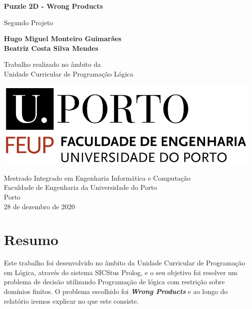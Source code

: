 \documentclass[11pt]{article}
\begin{document}
\begin{titlepage}
	\begin{center}
		\vspace*{1cm}
		
		\Large
		\textbf{Puzzle 2D - Wrong Products}
		
		\vspace{0.5cm}
		\large
		Segundo Projeto
		
		\vspace{1.5cm}
		
		\textbf{Hugo Miguel Monteiro Guimarães}\\
		\textbf{Beatriz Costa Silva Mendes}
		
		\vspace{5cm}
		
		Trabalho realizado no âmbito da\\
		Unidade Curricular de Programação Lógica
		
		\vspace{0.8cm}
	
		\includegraphics[width=0.4 \textwidth]{feup_logo.png}
		
		\vspace{1.5cm}		
		
		\large
		Mestrado Integrado em Engenharia Informática e Computação\\
		Faculdade de Engenharia da Universidade do Porto\\
		Porto\\
		28	 de dezembro de 2020
	
	\end{center}
\end{titlepage}


\pagebreak
\tableofcontents

\pagebreak


\section{Resumo} 
Este trabalho foi desenvolvido no âmbito da Unidade Curricular de Programação em Lógica, 
através do sistema SICStus Prolog, e o seu objetivo foi resolver um problema de decisão 
utilizando Programação de lógica com restrição sobre domínios finitos. O problema escolhido 
foi \textbf{\emph{Wrong Products}} e ao longo do relatório iremos explicar no que este consiste.
\end{document}

